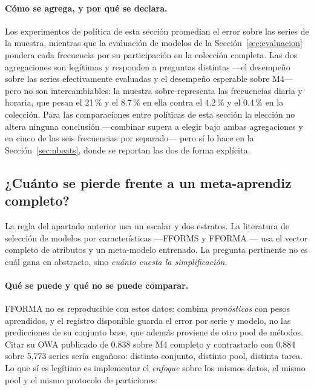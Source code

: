 \paragraph{Cómo se agrega, y por qué se declara.} Los experimentos de política de esta
sección promedian el error sobre las series de la muestra, mientras que la evaluación de
modelos de la Sección~\ref{sec:evaluacion} pondera cada frecuencia por su participación
en la colección completa. Las dos agregaciones son legítimas y responden a preguntas
distintas ---el desempeño sobre las series efectivamente evaluadas y el desempeño
esperable sobre M4--- pero no son intercambiables: la muestra sobre-representa las
frecuencias diaria y horaria, que pesan el 21\,\% y el 8.7\,\% en ella contra el 4.2\,\%
y el 0.4\,\% en la colección. Para las comparaciones entre políticas de esta sección la
elección no altera ninguna conclusión ---combinar supera a elegir bajo ambas
agregaciones y en cinco de las seis frecuencias por separado--- pero sí lo hace en la
Sección~\ref{sec:nbeats}, donde se reportan las dos de forma explícita.

\subsection{¿Cuánto se pierde frente a un meta-aprendiz completo?}\label{sec:meta}

La regla del apartado anterior usa un escalar y dos estratos. La literatura de
selección de modelos por características ---FFORMS \cite{talagala2018} y FFORMA
\cite{monteromanso2020}--- usa el vector completo de atributos y un meta-modelo
entrenado. La pregunta pertinente no es cuál gana en abstracto, sino \emph{cuánto
cuesta la simplificación}.

\paragraph{Qué se puede y qué no se puede comparar.} FFORMA no es reproducible con
estos datos: combina \emph{pronósticos} con pesos aprendidos, y el registro
disponible guarda el error por serie y modelo, no las predicciones de su conjunto
base, que además proviene de otro pool de métodos. Citar su OWA publicado de 0.838
sobre M4 completo y contrastarlo con 0.884 sobre 5{,}773 series sería engañoso:
distinto conjunto, distinto pool, distinta tarea. Lo que sí es legítimo es
implementar el \emph{enfoque} sobre los mismos datos, el mismo pool y el mismo
protocolo de particiones:

